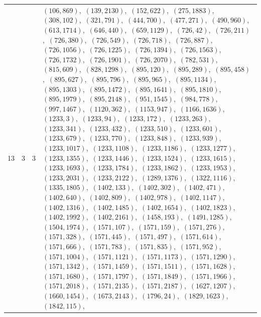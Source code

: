 \documentclass[11pt]{article}
\begin{document}
\begin{longtable}{@{}rrl>{\raggedright\arraybackslash}p{}@{}}
13 & 3 & $3$ & $(106,869)$,\allowbreak\ $(139,2130)$,\allowbreak\ $(152,622)$,\allowbreak\ $(275,1883)$,\allowbreak\ $(308,102)$,\allowbreak\ $(321,791)$,\allowbreak\ $(444,700)$,\allowbreak\ $(477,271)$,\allowbreak\ $(490,960)$,\allowbreak\ $(613,1714)$,\allowbreak\ $(646,440)$,\allowbreak\ $(659,1129)$,\allowbreak\ $(726,42)$,\allowbreak\ $(726,211)$,\allowbreak\ $(726,380)$,\allowbreak\ $(726,549)$,\allowbreak\ $(726,718)$,\allowbreak\ $(726,887)$,\allowbreak\ $(726,1056)$,\allowbreak\ $(726,1225)$,\allowbreak\ $(726,1394)$,\allowbreak\ $(726,1563)$,\allowbreak\ $(726,1732)$,\allowbreak\ $(726,1901)$,\allowbreak\ $(726,2070)$,\allowbreak\ $(782,531)$,\allowbreak\ $(815,609)$,\allowbreak\ $(828,1298)$,\allowbreak\ $(895,120)$,\allowbreak\ $(895,289)$,\allowbreak\ $(895,458)$,\allowbreak\ $(895,627)$,\allowbreak\ $(895,796)$,\allowbreak\ $(895,965)$,\allowbreak\ $(895,1134)$,\allowbreak\ $(895,1303)$,\allowbreak\ $(895,1472)$,\allowbreak\ $(895,1641)$,\allowbreak\ $(895,1810)$,\allowbreak\ $(895,1979)$,\allowbreak\ $(895,2148)$,\allowbreak\ $(951,1545)$,\allowbreak\ $(984,778)$,\allowbreak\ $(997,1467)$,\allowbreak\ $(1120,362)$,\allowbreak\ $(1153,947)$,\allowbreak\ $(1166,1636)$,\allowbreak\ $(1233,3)$,\allowbreak\ $(1233,94)$,\allowbreak\ $(1233,172)$,\allowbreak\ $(1233,263)$,\allowbreak\ $(1233,341)$,\allowbreak\ $(1233,432)$,\allowbreak\ $(1233,510)$,\allowbreak\ $(1233,601)$,\allowbreak\ $(1233,679)$,\allowbreak\ $(1233,770)$,\allowbreak\ $(1233,848)$,\allowbreak\ $(1233,939)$,\allowbreak\ $(1233,1017)$,\allowbreak\ $(1233,1108)$,\allowbreak\ $(1233,1186)$,\allowbreak\ $(1233,1277)$,\allowbreak\ $(1233,1355)$,\allowbreak\ $(1233,1446)$,\allowbreak\ $(1233,1524)$,\allowbreak\ $(1233,1615)$,\allowbreak\ $(1233,1693)$,\allowbreak\ $(1233,1784)$,\allowbreak\ $(1233,1862)$,\allowbreak\ $(1233,1953)$,\allowbreak\ $(1233,2031)$,\allowbreak\ $(1233,2122)$,\allowbreak\ $(1289,1376)$,\allowbreak\ $(1322,1116)$,\allowbreak\ $(1335,1805)$,\allowbreak\ $(1402,133)$,\allowbreak\ $(1402,302)$,\allowbreak\ $(1402,471)$,\allowbreak\ $(1402,640)$,\allowbreak\ $(1402,809)$,\allowbreak\ $(1402,978)$,\allowbreak\ $(1402,1147)$,\allowbreak\ $(1402,1316)$,\allowbreak\ $(1402,1485)$,\allowbreak\ $(1402,1654)$,\allowbreak\ $(1402,1823)$,\allowbreak\ $(1402,1992)$,\allowbreak\ $(1402,2161)$,\allowbreak\ $(1458,193)$,\allowbreak\ $(1491,1285)$,\allowbreak\ $(1504,1974)$,\allowbreak\ $(1571,107)$,\allowbreak\ $(1571,159)$,\allowbreak\ $(1571,276)$,\allowbreak\ $(1571,328)$,\allowbreak\ $(1571,445)$,\allowbreak\ $(1571,497)$,\allowbreak\ $(1571,614)$,\allowbreak\ $(1571,666)$,\allowbreak\ $(1571,783)$,\allowbreak\ $(1571,835)$,\allowbreak\ $(1571,952)$,\allowbreak\ $(1571,1004)$,\allowbreak\ $(1571,1121)$,\allowbreak\ $(1571,1173)$,\allowbreak\ $(1571,1290)$,\allowbreak\ $(1571,1342)$,\allowbreak\ $(1571,1459)$,\allowbreak\ $(1571,1511)$,\allowbreak\ $(1571,1628)$,\allowbreak\ $(1571,1680)$,\allowbreak\ $(1571,1797)$,\allowbreak\ $(1571,1849)$,\allowbreak\ $(1571,1966)$,\allowbreak\ $(1571,2018)$,\allowbreak\ $(1571,2135)$,\allowbreak\ $(1571,2187)$,\allowbreak\ $(1627,1207)$,\allowbreak\ $(1660,1454)$,\allowbreak\ $(1673,2143)$,\allowbreak\ $(1796,24)$,\allowbreak\ $(1829,1623)$,\allowbreak\ $(1842,115)$,\allowbreak\ 
\end{longtable}
\end{document}
